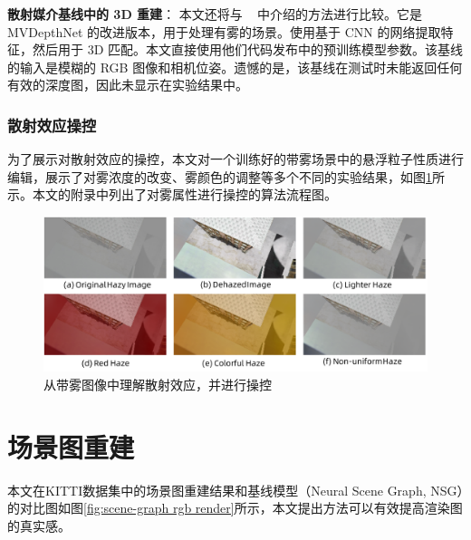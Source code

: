 \noindent\textbf{散射媒介基线中的 3D 重建}：
本文还将与 ~\cite{fujimura_dehazing_2021} 中介绍的方法进行比较。它是 MVDepthNet 的改进版本，用于处理有雾的场景。使用基于 CNN 的网络提取特征，然后用于 3D 匹配。本文直接使用他们代码发布中的预训练模型参数。该基线的输入是模糊的 RGB 图像和相机位姿。遗憾的是，该基线在测试时未能返回任何有效的深度图，因此未显示在实验结果中。



\subsubsection{散射效应操控}
为了展示对散射效应的操控，本文对一个训练好的带雾场景中的悬浮粒子性质进行编辑，展示了对雾浓度的改变、雾颜色的调整等多个不同的实验结果，如图\ref{fig:dehazenerf-manipulation}所示。本文的附录中列出了对雾属性进行操控的算法流程图。

\begin{figure}[ht]
    \centering
    \includegraphics[width=\textwidth]{undergraduate-thesis/images/experiments/haze-manipulation.pdf}
    \caption{从带雾图像中理解散射效应，并进行操控}
    \label{fig:dehazenerf-manipulation}
\end{figure}

\newpage
\section{场景图重建}
本文在KITTI数据集中的场景图重建结果和基线模型（Neural Scene Graph, NSG\cite{ost_neural_2021}）的对比图如图\ref{fig:scene-graph rgb render}所示，本文提出方法可以有效提高渲染图的真实感。

\begin{table}[ht]
\centering
{}
\caption{场景图模型的数值对比结果}
\label{tab:scene-graphs}
\end{table}

